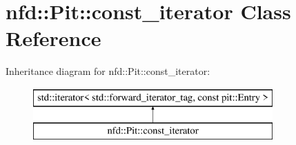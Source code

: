 \hypertarget{classnfd_1_1Pit_1_1const__iterator}{}\section{nfd\+:\+:Pit\+:\+:const\+\_\+iterator Class Reference}
\label{classnfd_1_1Pit_1_1const__iterator}
Inheritance diagram for nfd\+:\+:Pit\+:\+:const\+\_\+iterator\+:\begin{figure}[H]
\begin{center}
\leavevmode
\includegraphics[height=2.000000cm]{classnfd_1_1Pit_1_1const__iterator}
\end{center}
\end{figure}
